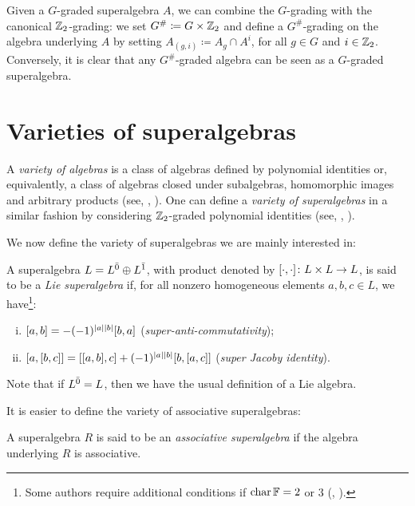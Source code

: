 \label{defi:G-sharp}
Given a $G$-graded superalgebra $A$, we can combine the $G$-grading with the canonical $\mathbb{Z}_2$-grading:
we set $G^\#\coloneqq G\times \mathbb{Z}_2$ and define a $G^\#$-grading on the algebra underlying $A$ by setting $A_{(g,i)} \coloneqq A_g \cap A^i$, for all $g\in G$ and $i\in \mathbb{Z}_2$. 
Conversely, it is clear that any $G^\#$-graded algebra can be seen as a $G$-graded superalgebra. 

\section{Varieties of superalgebras}\label{sec:Grassmann}

A \emph{variety of algebras} is a class of algebras defined by polynomial identities or, equivalently, a class of algebras closed under subalgebras, homomorphic images and arbitrary products (see, \eg, \cite{MR2176105,Cohn_universal}). 
One can define a \emph{variety of superalgebras} in a similar fashion by considering $\mathbb{Z}_2$-graded polynomial identities (see, \eg, \cite{MR886063,MR1192546}).

We now define the variety of superalgebras we are mainly interested in:

\begin{defi}\label{def:Lie-sa}
	A superalgebra $L=L^{\bar0}\oplus L^{\bar1}$, with product denoted by $[\cdot, \cdot]\colon L\times L \to L$, is said to be a \emph{Lie superalgebra} if, for all nonzero homogeneous elements $a, b, c \in L$, we have\footnote{Some authors require additional conditions if $\operatorname{char} \mathbb{F} = 2$ or $3$ (\eg, \cite[Subsection 1.2]{MR1192546}).}:
	\begin{enumerate}[(i)]
		\item $[ a, b ] = - (-1)^{|a||b|} [b, a]$ (\emph{super-anti-commutativity});
		\item $[a,[b,c]] = [[a,b],c] + (-1)^{|a||b|} [b, [a,c]]$ (\emph{super Jacoby identity}).
	\end{enumerate}
\end{defi}

Note that if $L^{\bar0} = L$, then we have the usual definition of a Lie algebra. 

It is easier to define the variety of associative superalgebras:

\begin{defi}\label{def:associative-sa}
    A superalgebra $R$ is said to be an \emph{associative superalgebra} if the algebra underlying $R$ is associative. 
\end{defi}

